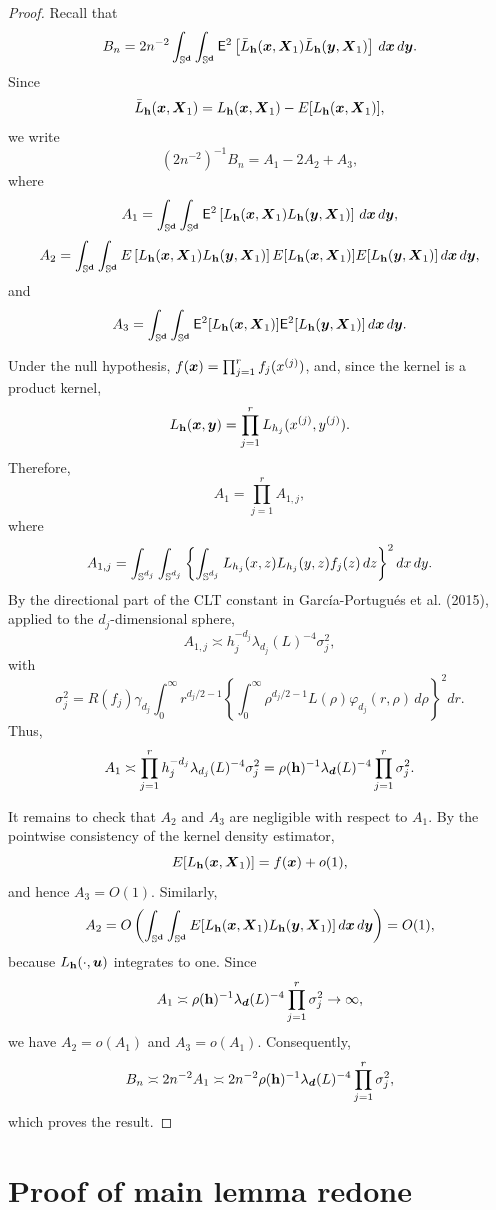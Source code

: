 \documentclass{article}
\begin{document}
\begin{proof}
Recall that
\[
B_n
=
2n^{-2}\int_{\mathbb{S}^{\mathbf d}}\int_{\mathbb{S}^{\mathbf d}}
\mathsf{E}^2\left[
\bar{L}_{\mathbf h}(\boldsymbol{x},\boldsymbol{X}_1)
\bar{L}_{\mathbf h}(\boldsymbol{y},\boldsymbol{X}_1)
\right]
\,d\boldsymbol{x}\,d\boldsymbol{y} .
\]
Since
\[
\bar{L}_{\mathbf h}(\boldsymbol{x},\boldsymbol{X}_1)
=
L_{\mathbf h}(\boldsymbol{x},\boldsymbol{X}_1)
-
E[L_{\mathbf h}(\boldsymbol{x},\boldsymbol{X}_1)],
\]
we write
\[
(2n^{-2})^{-1}B_n=A_1-2A_2+A_3,
\]
where
\[
A_1
=
\int_{\mathbb{S}^{\mathbf d}}\int_{\mathbb{S}^{\mathbf d}}
\mathsf{E}^2\left[
L_{\mathbf h}(\boldsymbol{x},\boldsymbol{X}_1)L_{\mathbf h}(\boldsymbol{y},\boldsymbol{X}_1)
\right]
\,d\boldsymbol{x}\,d\boldsymbol{y},
\]
\[
A_2
=
\int_{\mathbb{S}^{\mathbf d}}\int_{\mathbb{S}^{\mathbf d}}
E\left[
L_{\mathbf h}(\boldsymbol{x},\boldsymbol{X}_1)L_{\mathbf h}(\boldsymbol{y},\boldsymbol{X}_1)
\right]
E[L_{\mathbf h}(\boldsymbol{x},\boldsymbol{X}_1)]
E[L_{\mathbf h}(\boldsymbol{y},\boldsymbol{X}_1)]
\,d\boldsymbol{x}\,d\boldsymbol{y},
\]
and
\[
A_3
=
\int_{\mathbb{S}^{\mathbf d}}\int_{\mathbb{S}^{\mathbf d}}
\mathsf{E}^2[L_{\mathbf h}(\boldsymbol{x},\boldsymbol{X}_1)]
\mathsf{E}^2[L_{\mathbf h}(\boldsymbol{y},\boldsymbol{X}_1)]
\,d\boldsymbol{x}\,d\boldsymbol{y}.
\]

Under the null hypothesis, \(f(\boldsymbol{x})=\prod_{j=1}^r f_j(x^{(j)})\), and, since the kernel is a product kernel,
\[
L_{\mathbf h}(\boldsymbol{x},\boldsymbol{y})
=
\prod_{j=1}^r L_{h_j}(x^{(j)},y^{(j)}).
\]
Therefore,
\[
A_1=\prod_{j=1}^r A_{1,j},
\]
where
\[
A_{1,j}
=
\int_{\mathbb{S}^{d_j}}\int_{\mathbb{S}^{d_j}}
\left\{
\int_{\mathbb{S}^{d_j}}
L_{h_j}(x,z)L_{h_j}(y,z)f_j(z)\,dz
\right\}^2
dx\,dy.
\]
By the directional part of the CLT constant in García-Portugués et al. (2015), applied to the
\(d_j\)-dimensional sphere,
\[
A_{1,j}
\asymp
h_j^{-d_j}\lambda_{d_j}(L)^{-4}\sigma_j^2,
\]
with
\[
\sigma_j^2
=
R(f_j)\gamma_{d_j}
\int_0^\infty
r^{d_j/2-1}
\left\{
\int_0^\infty
\rho^{d_j/2-1}L(\rho)\varphi_{d_j}(r,\rho)
\,d\rho
\right\}^2
dr.
\]
Thus,
\[
A_1
\asymp
\prod_{j=1}^r
h_j^{-d_j}\lambda_{d_j}(L)^{-4}\sigma_j^2
=
\rho(\mathbf h)^{-1}\lambda_{\boldsymbol{d}}(L)^{-4}
\prod_{j=1}^r\sigma_j^2.
\]

It remains to check that \(A_2\) and \(A_3\) are negligible with respect to \(A_1\). By the pointwise
consistency of the kernel density estimator,
\[
E[L_{\mathbf h}(\boldsymbol{x},\boldsymbol{X}_1)]=f(\boldsymbol{x})+o(1),
\]
and hence \(A_3=O(1)\). Similarly,
\[
A_2
=
O\left(
\int_{\mathbb{S}^{\mathbf d}}\int_{\mathbb{S}^{\mathbf d}}
E[
L_{\mathbf h}(\boldsymbol{x},\boldsymbol{X}_1)L_{\mathbf h}(\boldsymbol{y},\boldsymbol{X}_1)
]
\,d\boldsymbol{x}\,d\boldsymbol{y}
\right)
=
O(1),
\]
because \(L_{\mathbf h}(\cdot,\boldsymbol{u})\) integrates to one. Since
\[
A_1\asymp \rho(\mathbf h)^{-1}\lambda_{\boldsymbol{d}}(L)^{-4}
\prod_{j=1}^r\sigma_j^2
\to \infty,
\]
we have \(A_2=o(A_1)\) and \(A_3=o(A_1)\). Consequently,
\[
B_n
\asymp
2n^{-2}A_1
\asymp
2n^{-2}\rho(\mathbf h)^{-1}\lambda_{\boldsymbol{d}}(L)^{-4}
\prod_{j=1}^r\sigma_j^2,
\]
which proves the result.
\end{proof}

\section{Proof of main lemma redone}
\end{document}
